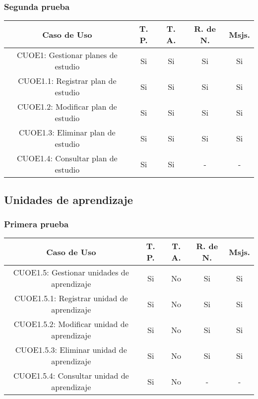 \subsubsection{Segunda prueba}
\begin{center}
	\begin{tabular}{ |c|c|c|c|c| } 
		\hline
		Caso de Uso & T. P. & T. A. & R. de N. & Msjs. \\
		\hline 
		CUOE1: Gestionar planes de estudio & Si & Si & Si & Si \\ 
		CUOE1.1: Registrar plan de estudio & Si & Si & Si & Si \\ 
		CUOE1.2: Modificar plan de estudio & Si & Si & Si & Si \\ 
		CUOE1.3: Eliminar plan de estudio & Si & Si & Si & Si \\ 
		CUOE1.4: Consultar plan de estudio & Si & Si & - & - \\  
		\hline
	\end{tabular}
\end{center}


\subsection{Unidades de aprendizaje}

\subsubsection{Primera prueba}
\begin{center}
	\begin{tabular}{ |c|c|c|c|c| } 
		\hline
		Caso de Uso & T. P. & T. A. & R. de N. & Msjs. \\
		\hline 
		CUOE1.5: Gestionar unidades de aprendizaje & Si & No & Si & Si \\ 
		CUOE1.5.1: Registrar unidad de aprendizaje & Si & No & Si & Si \\ 
		CUOE1.5.2: Modificar unidad de aprendizaje & Si & No & Si & Si \\ 
		CUOE1.5.3: Eliminar unidad de aprendizaje & Si & No & Si & Si \\ 
		CUOE1.5.4: Consultar unidad de aprendizaje & Si & No & - & - \\ 
		\hline
	\end{tabular}
\end{center}

